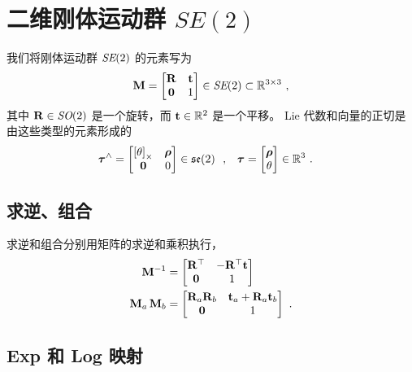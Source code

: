 

\section{二维刚体运动群 $SE(2)$}
\label{sec:SE2}


我们将刚体运动群 $\textit{SE}(2)$ 的元素写为
%
\begin{align}
{\bf M}= \begin{bmatrix}
{\bf R} & {\bf t} \\ \bf0 & 1
\end{bmatrix} \in \textit{SE}(2) \subset {\mathbb R}^{3\times3}
~,
\end{align}
%
其中 ${\bf R}\in\textit{SO}(2)$ 是一个旋转，而 ${\bf t}\in{\mathbb R}^2$ 是一个平移。
Lie 代数和向量的正切是由这些类型的元素形成的
%
\begin{align} 
{\bm \tau}^\wedge
  &= \begin{bmatrix}\left[\theta\right]_\times & {\bm \rho} \\ \bf0 & 0\end{bmatrix} \in {\mathfrak {se}}(2)
  ~~,
& 
{\bm \tau}
  &= \begin{bmatrix}{\bm \rho} \\ \theta\end{bmatrix}\in{\mathbb R}^3 
~.
\end{align}
%

\subsection{求逆、组合}

求逆和组合分别用矩阵的求逆和乘积执行，
%
\begin{align}
{\bf M}^{-1} &= \begin{bmatrix}
{\bf R}^{\top} & -{\bf R}^{\top}{\bf t} \\ \bf0 & 1
\end{bmatrix} 
\\
{\bf M}_a\,{\bf M}_b &= \begin{bmatrix}
{\bf R}_a{\bf R}_b & {\bf t}_a+{\bf R}_a{\bf t}_b \\ \bf0 & 1
\end{bmatrix} 
~.
\end{align}

\subsection{Exp 和 Log 映射}

